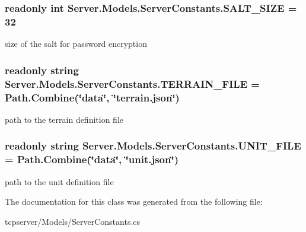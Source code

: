 \subsubsection[{S\+A\+L\+T\+\_\+\+S\+I\+Z\+E}]{\setlength{\rightskip}{0pt plus 5cm}readonly int Server.\+Models.\+Server\+Constants.\+S\+A\+L\+T\+\_\+\+S\+I\+Z\+E = 32\hspace{0.3cm}{\ttfamily [static]}}\label{classServer_1_1Models_1_1ServerConstants_a2627c643caf77b36fed32b74811438f2}


size of the salt for password encryption 

\hypertarget{classServer_1_1Models_1_1ServerConstants_a7f75857909d69ae4f0383bd056bb7ece}{}
\subsubsection[{T\+E\+R\+R\+A\+I\+N\+\_\+\+F\+I\+L\+E}]{\setlength{\rightskip}{0pt plus 5cm}readonly string Server.\+Models.\+Server\+Constants.\+T\+E\+R\+R\+A\+I\+N\+\_\+\+F\+I\+L\+E = Path.\+Combine(\char`\"{}data\char`\"{}, \char`\"{}terrain.\+json\char`\"{})\hspace{0.3cm}{\ttfamily [static]}}\label{classServer_1_1Models_1_1ServerConstants_a7f75857909d69ae4f0383bd056bb7ece}


path to the terrain definition file 

\hypertarget{classServer_1_1Models_1_1ServerConstants_ab3ffa60d4d7a6a7ca066f99e815b9471}{}
\subsubsection[{U\+N\+I\+T\+\_\+\+F\+I\+L\+E}]{\setlength{\rightskip}{0pt plus 5cm}readonly string Server.\+Models.\+Server\+Constants.\+U\+N\+I\+T\+\_\+\+F\+I\+L\+E = Path.\+Combine(\char`\"{}data\char`\"{}, \char`\"{}unit.\+json\char`\"{})\hspace{0.3cm}{\ttfamily [static]}}\label{classServer_1_1Models_1_1ServerConstants_ab3ffa60d4d7a6a7ca066f99e815b9471}


path to the unit definition file 



The documentation for this class was generated from the following file\+:\begin{DoxyCompactItemize}
\item 
tcpserver/\+Models/Server\+Constants.\+cs\end{DoxyCompactItemize}
